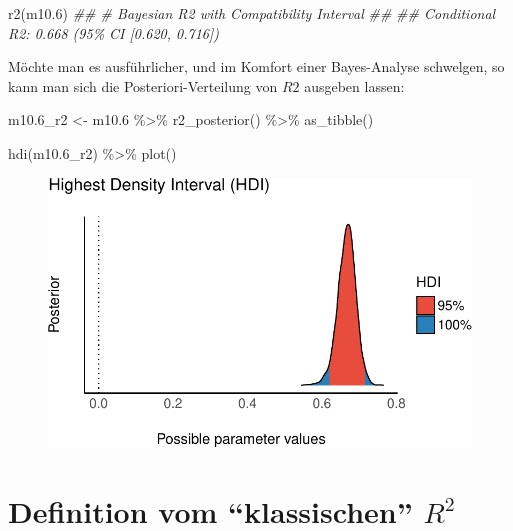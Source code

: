 \documentclass[
  a4paper,
  DIV=11]{scrreprt}
\newenvironment{Shaded}{\begin{snugshade}}{\end{snugshade}}
\newcommand{\DocumentationTok}[1]{\textcolor[rgb]{0.37,0.37,0.37}{\textit{#1}}}
\newcommand{\FloatTok}[1]{\textcolor[rgb]{0.68,0.00,0.00}{#1}}
\newcommand{\FunctionTok}[1]{\textcolor[rgb]{0.28,0.35,0.67}{#1}}
\newcommand{\NormalTok}[1]{\textcolor[rgb]{0.00,0.23,0.31}{#1}}
\newcommand{\OtherTok}[1]{\textcolor[rgb]{0.00,0.23,0.31}{#1}}
\newcommand{\SpecialCharTok}[1]{\textcolor[rgb]{0.37,0.37,0.37}{#1}}
\theoremstyle{definition}
\theoremstyle{remark}
\begin{document}
\begin{Shaded}
\begin{Highlighting}[]
\FunctionTok{r2}\NormalTok{(m10}\FloatTok{.6}\NormalTok{)}
\DocumentationTok{\#\# \# Bayesian R2 with Compatibility Interval}
\DocumentationTok{\#\# }
\DocumentationTok{\#\#   Conditional R2: 0.668 (95\% CI [0.620, 0.716])}
\end{Highlighting}
\end{Shaded}

Möchte man es ausführlicher, und im Komfort einer Bayes-Analyse
schwelgen, so kann man sich die Posteriori-Verteilung von \(R2\)
ausgeben lassen:

\begin{Shaded}
\begin{Highlighting}[]
\NormalTok{m10}\FloatTok{.6}\NormalTok{\_r2 }\OtherTok{\textless{}{-}}
\NormalTok{m10}\FloatTok{.6} \SpecialCharTok{\%\textgreater{}\%} 
  \FunctionTok{r2\_posterior}\NormalTok{() }\SpecialCharTok{\%\textgreater{}\%} 
  \FunctionTok{as\_tibble}\NormalTok{()}

\FunctionTok{hdi}\NormalTok{(m10}\FloatTok{.6}\NormalTok{\_r2) }\SpecialCharTok{\%\textgreater{}\%} 
  \FunctionTok{plot}\NormalTok{()}
\end{Highlighting}
\end{Shaded}

\begin{figure}[H]

{\centering \includegraphics{./metrische-AV_files/figure-pdf/unnamed-chunk-33-1.pdf}

}

\end{figure}

\hypertarget{definition-vom-klassischen-r2}{%
\section{\texorpdfstring{Definition vom ``klassischen''
\(R^2\)}{Definition vom ``klassischen'' R\^{}2}}\label{definition-vom-klassischen-r2}}
\end{document}
